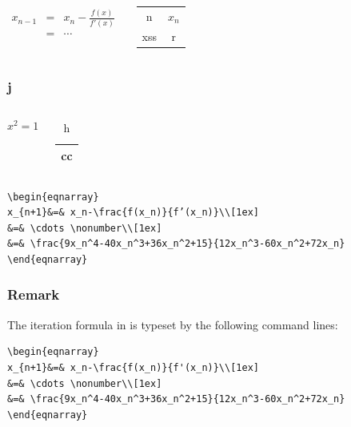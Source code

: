 \documentclass{beamer}
\begin{document}
\begin{frame}
\begin{columns}
		\begin{eqnarray}
		x_{n-1}&=&x_n-\frac{f(x)}{f'(x)}\\
		&=&\cdots\nonumber
		\end{eqnarray}
		\begin{tabular}{|c|c|}
		\hline
		n&$x_n$\\
		xss&r\\
		\hline
		\end{tabular}
\end{columns}
\end{frame}
\begin{frame}
\frametitle{j}
\begin{columns}
\begin{equation}
x^2=1
\end{equation}
\begin{table}[h]
\centering
\begin{tabular}{|c|}
\hline
cc\\
\hline
\end{tabular}
\caption{h}
\end{table}
\end{columns}
\vfill
\end{frame}
\begin{frame}[fragile]
\begin{verbatim}
\begin{eqnarray}
x_{n+1}&=& x_n-\frac{f(x_n)}{f’(x_n)}\\[1ex]
&=& \cdots \nonumber\\[1ex]
&=& \frac{9x_n^4-40x_n^3+36x_n^2+15}{12x_n^3-60x_n^2+72x_n}
\end{eqnarray}
\end{verbatim}
\end{frame}
\begin{frame}[fragile]\frametitle{Remark} %
The iteration formula in \hyperlink{frame:fig}{} is typeset by the following command lines:\\
\begin{verbatim}
\begin{eqnarray}
x_{n+1}&=& x_n-\frac{f(x_n)}{f'(x_n)}\\[1ex]
&=& \cdots \nonumber\\[1ex]
&=& \frac{9x_n^4-40x_n^3+36x_n^2+15}{12x_n^3-60x_n^2+72x_n}
\end{eqnarray}
\end{verbatim}
\end{frame}
\end{document}
